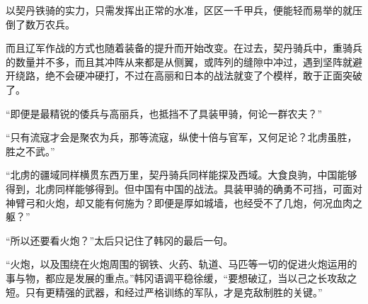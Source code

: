 以契丹铁骑的实力，只需发挥出正常的水准，区区一千甲兵，便能轻而易举的就压倒了数万农兵。

而且辽军作战的方式也随着装备的提升而开始改变。在过去，契丹骑兵中，重骑兵的数量并不多，而且其冲阵从来都是从侧翼，或阵列的缝隙中冲过，遇到坚阵就避开绕路，绝不会硬冲硬打，不过在高丽和日本的战法就变了个模样，敢于正面突破了。

“即便是最精锐的倭兵与高丽兵，也抵挡不了具装甲骑，何论一群农夫？”

“只有流寇才会是聚农为兵，那等流寇，纵使十倍与官军，又何足论？北虏虽胜，胜之不武。”

“北虏的疆域同样横贯东西万里，契丹骑兵同样能探及西域。大食良驹，中国能够得到，北虏同样能够得到。但中国有中国的战法。具装甲骑的确勇不可挡，可面对神臂弓和火炮，却又能有何施为？即便是厚如城墙，也经受不了几炮，何况血肉之躯？”

“所以还要看火炮？”太后只记住了韩冈的最后一句。

“火炮，以及围绕在火炮周围的钢铁、火药、轨道、马匹等一切的促进火炮运用的事与物，都应是发展的重点。”韩冈语调平稳徐缓，“要想破辽，当以己之长攻敌之短。只有更精强的武器，和经过严格训练的军队，才是克敌制胜的关键。”

